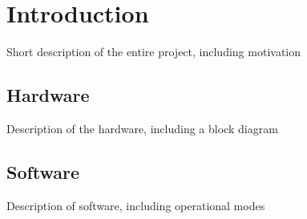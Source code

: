 \newpage
\chapter{Introduction}
\label{chap:introduction}

Short description of the entire project, including motivation

\section{Hardware}
\label{sec:intro_hardware}

Description of the hardware, including a block diagram

\section{Software}
\label{sec:intro_software}

Description of software, including operational modes